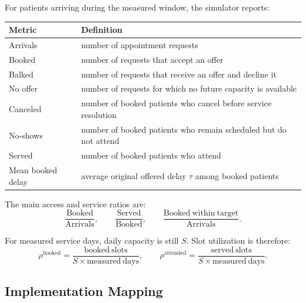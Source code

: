 \documentclass[11pt]{article}
\begin{document}
For patients arriving during the measured window, the simulator reports:
\begin{center}
\small
\begin{tabular}{L{0.28\textwidth} L{0.62\textwidth}}
\toprule
\textbf{Metric} & \textbf{Definition} \\
\midrule
Arrivals & number of appointment requests \\
\addlinespace
Booked & number of requests that accept an offer \\
\addlinespace
Balked & number of requests that receive an offer and decline it \\
\addlinespace
No offer & number of requests for which no future capacity is available \\
\addlinespace
Canceled & number of booked patients who cancel before service resolution \\
\addlinespace
No-shows & number of booked patients who remain scheduled but do not attend \\
\addlinespace
Served & number of booked patients who attend \\
\addlinespace
Mean booked delay & average original offered delay \(\tau\) among booked patients \\
\bottomrule
\end{tabular}
\normalsize
\end{center}

The main access and service ratios are:
\[
\frac{\mathrm{Booked}}{\mathrm{Arrivals}},
\qquad
\frac{\mathrm{Served}}{\mathrm{Booked}},
\qquad
\frac{\mathrm{Booked\ within\ target}}{\mathrm{Arrivals}}.
\]

For measured service days, daily capacity is still \(S\). Slot utilization is therefore:
\[
\rho^{\mathrm{booked}}
=
\frac{\mathrm{booked\ slots}}{S\times\mathrm{measured\ days}},
\qquad
\rho^{\mathrm{attended}}
=
\frac{\mathrm{served\ slots}}{S\times\mathrm{measured\ days}}.
\]

\subsection{Implementation Mapping}
\end{document}
